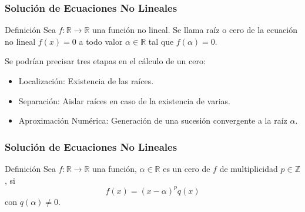 \documentclass{beamer}
\begin{document}
\frame
{
\frametitle{Soluci\'on de Ecuaciones No Lineales}

\begin{block}{Definici\'on}
Sea $f:\mathbb{R} \rightarrow \mathbb{R}$ una funci\'on no lineal. Se llama ra\'iz o cero de la ecuaci\'on no lineal $f(x)=0$ a todo valor $\alpha \in \mathbb{R}$ tal que $f(\alpha)=0$.

\end{block}

Se podr\'ian precisar tres etapas en el c\'alculo de un cero:

\begin{itemize}
\item<1-> Localizaci\'on: Existencia de las ra\'ices.
\item<2-> Separaci\'on: Aislar ra\'ices en caso de la existencia de varias.
\item<3-> Aproximaci\'on Num\'erica: Generaci\'on de una sucesi\'on convergente a la ra\'iz $\alpha$.
\end{itemize}
}
\frame
{
\frametitle{Soluci\'on de Ecuaciones No Lineales}
\begin{block}{Definici\'on}
  Sea $f : \mathbb{R} \to \mathbb{R}$ una funci\'on, $\alpha \in \mathbb{R}$ es un cero de $f$ de multiplicidad $p \in \mathbb{Z}$, si
$$
f(x)=(x-\alpha)^pq(x)
$$
con $q(\alpha)\neq 0$.
\end{block}

}
\end{document}
